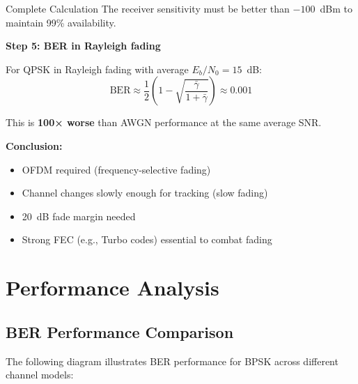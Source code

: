 \begin{calloutbox}{Complete Calculation}
The receiver sensitivity must be better than $-100$~dBm to maintain 99\% availability.

\textbf{Step 5: BER in Rayleigh fading}

For QPSK in Rayleigh fading with average $E_b/N_0 = 15$~dB:
\begin{equation}
\text{BER} \approx \frac{1}{2}\left(1 - \sqrt{\frac{\bar{\gamma}}{1 + \bar{\gamma}}}\right) \approx 0.001
\end{equation}

This is \textbf{100× worse} than AWGN performance at the same average SNR.

\textbf{Conclusion:}
\begin{itemize}
\item OFDM required (frequency-selective fading)
\item Channel changes slowly enough for tracking (slow fading)
\item 20~dB fade margin needed
\item Strong FEC (e.g., Turbo codes) essential to combat fading
\end{itemize}
\end{calloutbox}

\section{Performance Analysis}

\subsection{BER Performance Comparison}

The following diagram illustrates BER performance for BPSK across different channel models:

